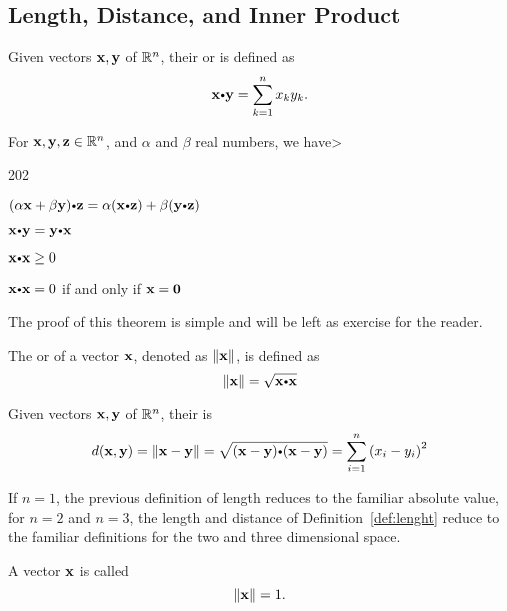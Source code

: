 \subsection*{Length, Distance, and Inner Product}

\begin{df}
Given vectors $\mathbf{ x}, \mathbf{ y} $ of $\mathbb{R}^n$, their  or  is defined as $$ \dotprod{x}{y}  = \sum _{k=1} ^n x_ky_k.$$
\end{df}

\begin{thm}
 For  $\mathbf{ x}, \mathbf{ y},  \mathbf{ z} \in \mathbb{R}^n$, and $\alpha$ and $\beta$ real numbers, we have>
\begin{dingautolist}{202}
 \item $(\alpha \vector{x}+\beta \vector{y}) \bp \vector{z}= \alpha (\vector{x}\bp \vector{z})+\beta  (\vector{y}\bp \vector{z})$
 \item $\vector{x}\bp \vector{y}= \vector{y} \bp \vector{x}$
 \item $\vector{x}\bp \vector{x}\geq 0$
 \item $\vector{x}\bp \vector{x}= 0$ if and only if $\mathbf{ x}=\mathbf{ 0}$
\end{dingautolist}

\end{thm}

The proof of this theorem is simple and will be left as exercise for the reader.

The  or  of a vector $\mathbf{ x}$, denoted as ${\left\|\mathbf{ x}\right\|}$, is defined as 
\[\norm{\vector{x}}=\sqrt{ \dotprod{x}{x}} \]

\begin{df}
 Given vectors $\mathbf{ x}, \mathbf{ y} $ of $\mathbb{R}^n$, their  is 
\[d(\vector{x},\vector{y})=\norm{\vector{x}-\vector{y}}=\sqrt{\dotprod{(x-y)}{
(x-y)}}=\sum_{i=1}^n \left(x_i-y_i \right)^2\]
\label{def:lenght}
\end{df}

If $n=1$, the previous definition of length  reduces to the familiar absolute
value, for $n=2$ and $n=3$, the length
and distance of Definition~\ref{def:lenght} reduce to the familiar
definitions for the two and three dimensional space.
\begin{df} A vector  $\mathbf{ x}$  is  called 
 \[ {\left\|\mathbf{ x}\right\|}=1.\]
\end{df}



